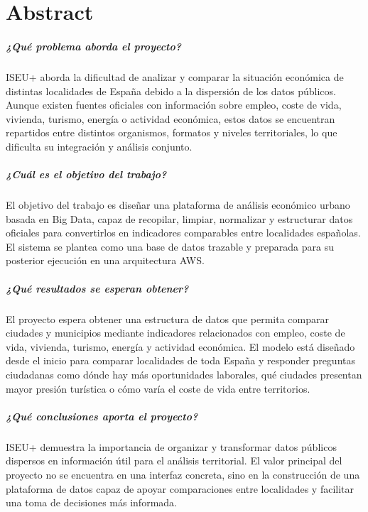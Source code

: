 \chapter*{Abstract}

\paragraph*{¿Qué problema aborda el proyecto?}
ISEU+ aborda la dificultad de analizar y comparar la situación económica de distintas localidades de España debido a la dispersión de los datos públicos. Aunque existen fuentes oficiales con información sobre empleo, coste de vida, vivienda, turismo, energía o actividad económica, estos datos se encuentran repartidos entre distintos organismos, formatos y niveles territoriales, lo que dificulta su integración y análisis conjunto.

\paragraph*{¿Cuál es el objetivo del trabajo?}
El objetivo del trabajo es diseñar una plataforma de análisis económico urbano basada en Big Data, capaz de recopilar, limpiar, normalizar y estructurar datos oficiales para convertirlos en indicadores comparables entre localidades españolas. El sistema se plantea como una base de datos trazable y preparada para su posterior ejecución en una arquitectura AWS.

\paragraph*{¿Qué resultados se esperan obtener?}
El proyecto espera obtener una estructura de datos que permita comparar ciudades y municipios mediante indicadores relacionados con empleo, coste de vida, vivienda, turismo, energía y actividad económica. El modelo está diseñado desde el inicio para comparar localidades de toda España y responder preguntas ciudadanas como dónde hay más oportunidades laborales, qué ciudades presentan mayor presión turística o cómo varía el coste de vida entre territorios.

\paragraph*{¿Qué conclusiones aporta el proyecto?}
ISEU+ demuestra la importancia de organizar y transformar datos públicos dispersos en información útil para el análisis territorial. El valor principal del proyecto no se encuentra en una interfaz concreta, sino en la construcción de una plataforma de datos capaz de apoyar comparaciones entre localidades y facilitar una toma de decisiones más informada.

